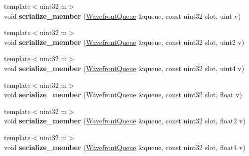 \begin{DoxyCompactItemize}
\item 
\mbox{\label{group___wavefront_queues_gabc7f5f0bbe6e3a97669b78dea7a2d75b}} 
{\footnotesize template$<$uint32 m$>$ }\\void {\bfseries serialize\+\_\+member} (\hyperlink{struct_wavefront_queue}{Wavefront\+Queue} \&queue, const uint32 slot, uint v)
\item 
\mbox{\label{group___wavefront_queues_gae5663a9e04a0573d3718fa819b7b108f}} 
{\footnotesize template$<$uint32 m$>$ }\\void {\bfseries serialize\+\_\+member} (\hyperlink{struct_wavefront_queue}{Wavefront\+Queue} \&queue, const uint32 slot, uint2 v)
\item 
\mbox{\label{group___wavefront_queues_gab23aabe087ed2b041f40644db32bf793}} 
{\footnotesize template$<$uint32 m$>$ }\\void {\bfseries serialize\+\_\+member} (\hyperlink{struct_wavefront_queue}{Wavefront\+Queue} \&queue, const uint32 slot, uint4 v)
\item 
\mbox{\label{group___wavefront_queues_ga64a9555aff17304c7eb13aa3d1f76784}} 
{\footnotesize template$<$uint32 m$>$ }\\void {\bfseries serialize\+\_\+member} (\hyperlink{struct_wavefront_queue}{Wavefront\+Queue} \&queue, const uint32 slot, float v)
\item 
\mbox{\label{group___wavefront_queues_gaf2c4cf0d3984c5215dcf446db25146d5}} 
{\footnotesize template$<$uint32 m$>$ }\\void {\bfseries serialize\+\_\+member} (\hyperlink{struct_wavefront_queue}{Wavefront\+Queue} \&queue, const uint32 slot, float2 v)
\item 
\mbox{\label{group___wavefront_queues_gaad963fb18a008ba1973aa5dc98ffc5cf}} 
{\footnotesize template$<$uint32 m$>$ }\\void {\bfseries serialize\+\_\+member} (\hyperlink{struct_wavefront_queue}{Wavefront\+Queue} \&queue, const uint32 slot, float4 v)
\item 
\mbox{\label{group___wavefront_queues_ga07a04f5235f6219b4ad3f5fe875afa18}} 

\end{DoxyCompactItemize}
